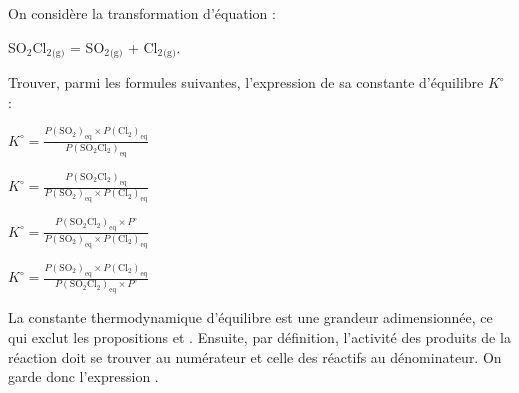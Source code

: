 \begin{enonce}
	On considère la transformation d'équation : 
	\begin{center}
	{SO$_2$Cl$_2$}$_\text{(g)}$ = {SO$_2$}$_\text{(g)}$ + {Cl$_2$}$_\text{(g)}$.
	\end{center}
	Trouver, parmi les formules suivantes, l'expression de sa constante d'équilibre $K^\circ$ :
	
	\medskip
	
	\begin{listeQCM2Colonnes}
	\item $K^\circ=\frac{P(\text{SO}_2)_\text{eq}\times P(\text{Cl}_2)_\text{eq}}{P(\text{SO}_2\text{Cl}_2)_\text{eq}}$\bigskip
	\item $K^\circ=\frac{P(\text{SO}_2\text{Cl}_2)_\text{eq}}{P(\text{SO}_2)_\text{eq}\times P(\text{Cl}_2)_\text{eq}}$
	\columnbreak
	\item $K^\circ=\frac{P(\text{SO}_2\text{Cl}_2)_\text{eq}\times P^\circ}{P(\text{SO}_2)_\text{eq}\times P(\text{Cl}_2)_\text{eq}}$\bigskip
	\item $K^\circ=\frac{P(\text{SO}_2)_\text{eq}\times P(\text{Cl}_2)_\text{eq}}{P(\text{SO}_2\text{Cl}_2)_\text{eq}\times P^\circ}$
	\end{listeQCM2Colonnes}
\smallskip

\end{enonce}

\reponse{\reponseD{}}

\begin{corrige}
La constante thermodynamique d'équilibre est une grandeur adimensionnée, ce qui exclut les propositions \reponseA{} et \reponseB{}. Ensuite, par définition, l'activité des produits de la réaction doit se trouver au numérateur et celle des réactifs au dénominateur. On garde donc l'expression \reponseD{}.
\end{corrige}


\finEntrainement







\hauteurLargeurCadreReponse		{6mm}{1.5cm}
\initialisationEntrainement


